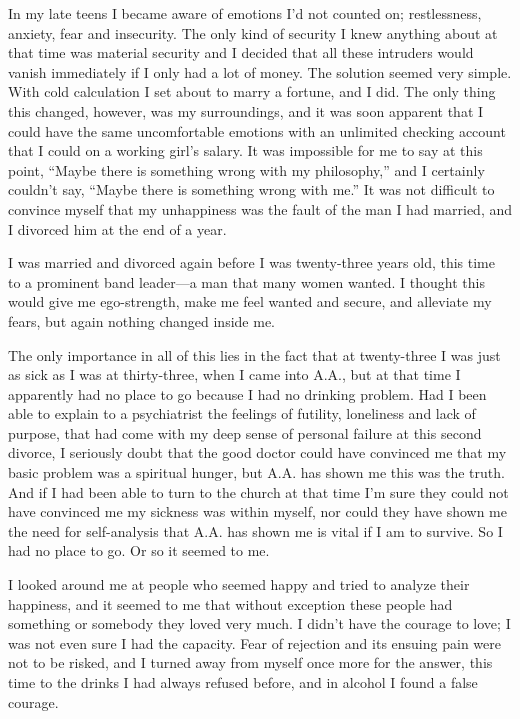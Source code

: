\begin{biblechapter}
In my late teens I became aware of emotions I’d not counted on; restlessness, anxiety, fear and insecurity. The only kind of security I knew anything about at that time was material security and I decided that all these intruders would vanish immediately if I only had a lot of money. The solution seemed very simple. With cold calculation I set about to marry a fortune, and I did. The only thing this changed, however, was my surroundings, and it was soon apparent that I could have the same uncomfortable emotions with an unlimited checking account that I could on a working girl’s salary. It was impossible for me to say at this point, “Maybe there is something wrong with my philosophy,” and I certainly couldn’t say, “Maybe there is something wrong with me.” It was not difficult to convince myself that my unhappiness was the fault of the man I had married, and I divorced him at the end of a year.

I was married and divorced again before I was twenty-three years old, this time to a prominent band leader—a man that many women wanted. I thought this would give me ego-strength, make me feel wanted and secure, and alleviate my fears, but again nothing changed inside me.

The only importance in all of this lies in the fact that at twenty-three I was just as sick as I was at thirty-three, when I came into A.A., but at that time I apparently had no place to go because I had no drinking problem. Had I been able to explain to a psychiatrist the feelings of futility, loneliness and lack of purpose, that had come with my deep sense of personal failure at this second divorce, I seriously doubt that the good doctor could have convinced me that my basic problem was a spiritual hunger, but A.A. has shown me this was the truth. And if I had been able to turn to the church at that time I’m sure they could not have convinced me my sickness was within myself, nor could they have shown me the need for self-analysis that A.A. has shown me is vital if I am to survive. So I had no place to go. Or so it seemed to me.

I looked around me at people who seemed happy and tried to analyze their happiness, and it seemed to me that without exception these people had something or somebody they loved very much. I didn’t have the courage to love; I was not even sure I had the capacity. Fear of rejection and its ensuing pain were not to be risked, and I turned away from myself once more for the answer, this time to the drinks I had always refused before, and in alcohol I found a false courage.


\end{biblechapter}
